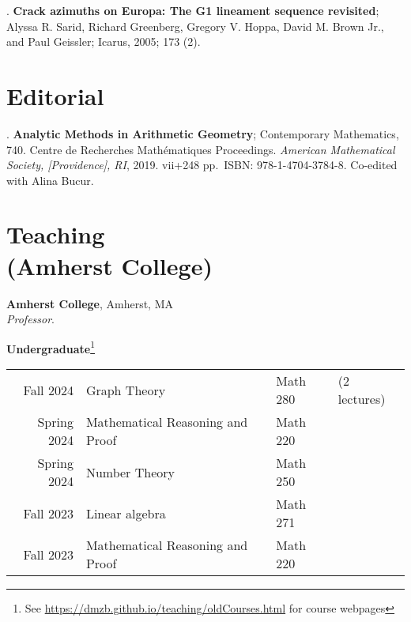 \documentclass[margin,line]{res}
\newcounter{pubs}
\newcommand{\defi}[1]{\textsf{#1}} 				%
\begin{document}
\begin{resume}
 .  \textbf{Crack azimuths on Europa: The G1 lineament sequence revisited}; Alyssa R. Sarid, Richard Greenberg, Gregory V. Hoppa, David M. Brown Jr., and Paul Geissler; Icarus, 2005; 173 (2). \vspace{.08cm}\\ 


\section{\sc Editorial}


 .  \textbf{Analytic Methods in Arithmetic Geometry}; Contemporary
Mathematics, 740. Centre de Recherches Math\'ematiques Proceedings. \emph{American Mathematical Society, [Providence], RI}, 2019. vii+248 pp.~ISBN: 978-1-4704-3784-8. Co-edited with Alina Bucur. \vspace{.08cm}\\ 


\newpage
\vspace{-7pt}
\section{\sc Teaching \\ (Amherst College)}

{\bf Amherst College}, Amherst, MA\\
\emph{Professor}. 
\vspace{2pt}




{\bf Undergraduate}\footnote{See \url{https://dmzb.github.io/teaching/oldCourses.html} for course webpages}
\vspace*{-.1in}

\begin{tabular}{rlll}
 Fall 2024 & \defi{Graph Theory} & Math 280& (2 lectures)\\    
 Spring 2024 & \defi{Mathematical Reasoning and Proof} & Math 220&\\  
 Spring 2024 & \defi{Number Theory} & Math 250&\\  
 Fall 2023 & \defi{Linear algebra} & Math 271&\\  
 Fall 2023 & \defi{Mathematical Reasoning and Proof} & Math 220&\\  
\end{tabular}


\end{resume}
\end{document}
